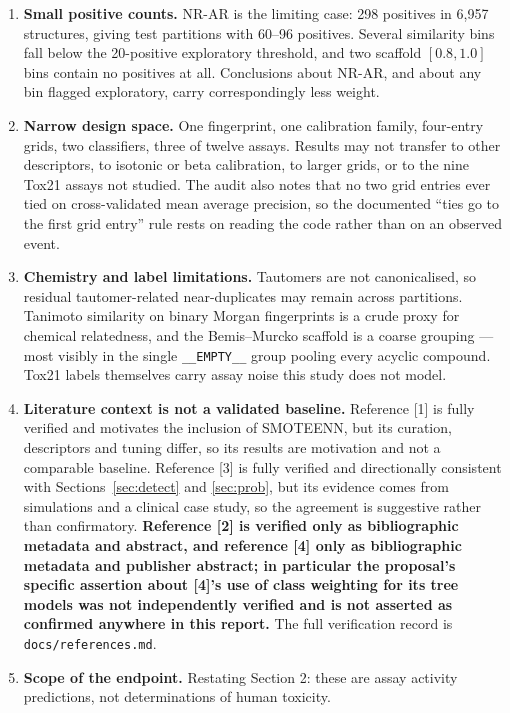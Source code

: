 \documentclass[10pt,letterpaper]{article}
\begin{document}
\begin{enumerate}
\item \textbf{Small positive counts.} NR-AR is the limiting case: 298 positives in 6{,}957 structures,
giving test partitions with 60--96 positives. Several similarity bins fall below the 20-positive
exploratory threshold, and two scaffold $[0.8,1.0]$ bins contain no positives at all. Conclusions
about NR-AR, and about any bin flagged exploratory, carry correspondingly less weight.

\item \textbf{Narrow design space.} One fingerprint, one calibration family, four-entry grids, two
classifiers, three of twelve assays. Results may not transfer to other descriptors, to isotonic or
beta calibration, to larger grids, or to the nine Tox21 assays not studied. The audit also notes that
no two grid entries ever tied on cross-validated mean average precision, so the documented ``ties go
to the first grid entry'' rule rests on reading the code rather than on an observed event.

\item \textbf{Chemistry and label limitations.} Tautomers are not canonicalised, so residual
tautomer-related near-duplicates may remain across partitions. Tanimoto similarity on binary Morgan
fingerprints is a crude proxy for chemical relatedness, and the Bemis--Murcko scaffold is a coarse
grouping --- most visibly in the single \texttt{\_\_EMPTY\_\_} group pooling every acyclic compound.
Tox21 labels themselves carry assay noise this study does not model.

\item \textbf{Literature context is not a validated baseline.} Reference [1] is fully verified and
motivates the inclusion of SMOTEENN, but its curation, descriptors and tuning differ, so its results
are motivation and not a comparable baseline. Reference [3] is fully verified and directionally
consistent with Sections~\ref{sec:detect} and \ref{sec:prob}, but its evidence comes from simulations
and a clinical case study, so the agreement is suggestive rather than confirmatory. \textbf{Reference
[2] is verified only as bibliographic metadata and abstract, and reference [4] only as bibliographic
metadata and publisher abstract; in particular the proposal's specific assertion about [4]'s use of
class weighting for its tree models was not independently verified and is not asserted as confirmed
anywhere in this report.} The full verification record is \texttt{docs/references.md}.

\item \textbf{Scope of the endpoint.} Restating Section 2: these are assay activity predictions, not
determinations of human toxicity.
\end{enumerate}
\end{document}
